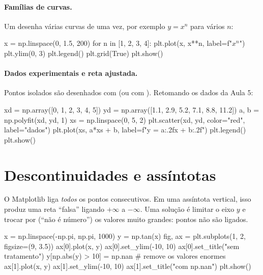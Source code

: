 \paragraph{Famílias de curvas.} Um  desenha várias curvas de uma vez, por exemplo $y=x^n$ para vários $n$:

\begin{entrada}
x = np.linspace(0, 1.5, 200)
for n in [1, 2, 3, 4]:
    plt.plot(x, x**n, label=f"$x^{n}$")
plt.ylim(0, 3)
plt.legend()
plt.grid(True)
plt.show()
\end{entrada}

\paragraph{Dados experimentais e reta ajustada.} Pontos isolados são desenhados com  (ou com
). Retomando os dados da Aula 5:

\begin{entrada}
xd = np.array([0, 1, 2, 3, 4, 5])
yd = np.array([1.1, 2.9, 5.2, 7.1, 8.8, 11.2])
a, b = np.polyfit(xd, yd, 1)
xs = np.linspace(0, 5, 2)
plt.scatter(xd, yd, color="red", label="dados")
plt.plot(xs, a*xs + b, label=f"y = {a:.2f}x + {b:.2f}")
plt.legend()
plt.show()
\end{entrada}

\section{Descontinuidades e assíntotas}

O Matplotlib liga \emph{todos} os pontos consecutivos. Em uma assíntota vertical, isso produz uma reta ``falsa''
ligando $+\infty$ a $-\infty$. Uma solução é limitar o eixo $y$ e trocar por  (``não é número'') os
valores muito grandes: pontos  não são ligados.

\begin{entrada}
x = np.linspace(-np.pi, np.pi, 1000)
y = np.tan(x)
fig, ax = plt.subplots(1, 2, figsize=(9, 3.5))
ax[0].plot(x, y)
ax[0].set_ylim(-10, 10)
ax[0].set_title("sem tratamento")
y[np.abs(y) > 10] = np.nan          # remove os valores enormes
ax[1].plot(x, y)
ax[1].set_ylim(-10, 10)
ax[1].set_title("com np.nan")
plt.show()
\end{entrada}

